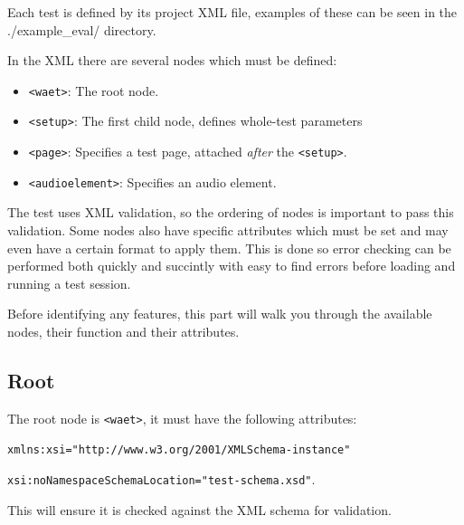 \documentclass[11pt, oneside]{article}   	%
\begin{document}
    Each test is defined by its project XML file, examples of these can be seen in the ./example\_eval/ directory.
    
    In the XML there are several nodes which must be defined:
	\begin{itemize}
	    \item \texttt{<waet>}: The root node.
	    \item \texttt{<setup>}: The first child node, defines whole-test parameters
	    \item \texttt{<page>}: Specifies a test page, attached \emph{after} the \texttt{<setup>}.
	    \item \texttt{<audioelement>}: Specifies an audio element.
	\end{itemize}

    The test uses XML validation, so the ordering of nodes is important to pass this validation. Some nodes also have specific attributes which must be set and may even have a certain format to apply them. This is done so error checking can be performed both quickly and succintly with easy to find errors before loading and running a test session.
    
    Before identifying any features, this part will walk you through the available nodes, their function and their attributes.
    
    \subsection{Root}
        The root node is \texttt{<waet>}, it must have the following attributes:
        
        \texttt{xmlns:xsi="http://www.w3.org/2001/XMLSchema-instance"}
        
        \texttt{xsi:noNamespaceSchemaLocation="test-schema.xsd"}.
        
        This will ensure it is checked against the XML schema for validation.
\end{document}
